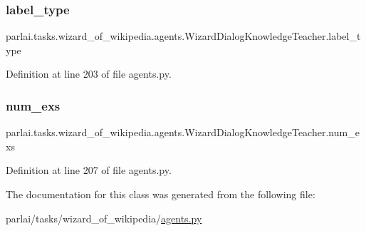 \subsubsection{\texorpdfstring{label\+\_\+type}{label\_type}}
{\footnotesize\ttfamily parlai.\+tasks.\+wizard\+\_\+of\+\_\+wikipedia.\+agents.\+Wizard\+Dialog\+Knowledge\+Teacher.\+label\+\_\+type}



Definition at line 203 of file agents.\+py.

\mbox{\label{classparlai_1_1tasks_1_1wizard__of__wikipedia_1_1agents_1_1WizardDialogKnowledgeTeacher_a263ebbfdc445fd19bc664ebf2e72ab30}} 
\subsubsection{\texorpdfstring{num\+\_\+exs}{num\_exs}}
{\footnotesize\ttfamily parlai.\+tasks.\+wizard\+\_\+of\+\_\+wikipedia.\+agents.\+Wizard\+Dialog\+Knowledge\+Teacher.\+num\+\_\+exs}



Definition at line 207 of file agents.\+py.



The documentation for this class was generated from the following file\+:\begin{DoxyCompactItemize}
\item 
parlai/tasks/wizard\+\_\+of\+\_\+wikipedia/\hyperlink{parlai_2tasks_2wizard__of__wikipedia_2agents_8py}{agents.\+py}\end{DoxyCompactItemize}
